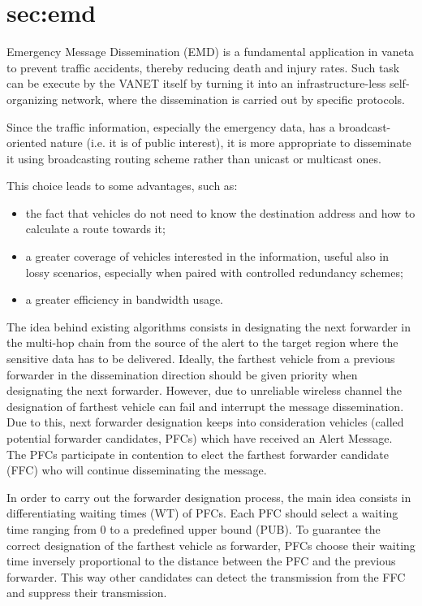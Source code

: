 	\section{sec:emd}
		Emergency Message Dissemination (EMD) is a fundamental application in \acrshort{vaneta} to prevent traffic accidents, thereby reducing death and injury rates. Such task can be execute by the VANET itself by turning it into an infrastructure-less self-organizing network, where the dissemination is carried out by specific protocols. 
		
		
		Since the traffic information, especially the emergency data, has a broadcast-oriented nature (i.e. it is of public interest), it is more appropriate to disseminate it using broadcasting routing scheme rather than unicast or multicast ones. \cite{5989903}
		
		This choice leads to some advantages, such as:
		\begin{itemize}
			\item the fact that vehicles do not need to know the destination address and how to calculate a route towards it;
			\item a greater coverage of vehicles interested in the information, useful also in lossy scenarios, especially when paired with controlled redundancy schemes;
			\item a greater efficiency in bandwidth usage.
		\end{itemize}
		
		The idea behind existing algorithms consists in designating the next forwarder in the multi-hop chain from the source of the alert to the target region where the sensitive data has to be delivered. Ideally, the farthest vehicle from a previous forwarder in the dissemination direction should be given priority when designating the next forwarder. However, due to unreliable wireless channel the designation of farthest vehicle can fail and interrupt the message dissemination. Due to this, next forwarder designation keeps into consideration vehicles (called potential forwarder candidates, PFCs) which have received an Alert Message. The PFCs participate in contention to elect the farthest forwarder candidate (FFC) who will continue disseminating the message.
		
		
		In order to carry out the forwarder designation process, the main idea consists in differentiating waiting times (WT) of PFCs. Each PFC should select a waiting time ranging from 0 to a predefined upper bound (PUB). To guarantee the correct designation of the farthest vehicle as forwarder, PFCs choose their waiting time inversely proportional to the distance between the PFC and the previous forwarder. This way other candidates can detect the transmission from the FFC and suppress their transmission.
		
